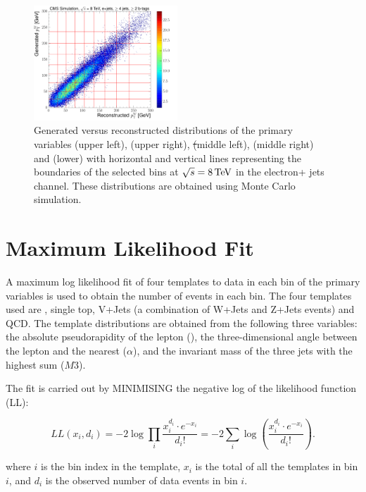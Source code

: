\begin{figure}[hbtp]
	 \includegraphics[width=0.48\textwidth]{Chapters/04_Analysis/04b_XSections/images/binning/electron_WPT_8TeV.pdf}\hfill
	 \caption{Generated versus reconstructed distributions of the primary variables \met (upper left), \HT (upper
	 right), \st (middle left), \mt (middle right) and \wpt (lower) with horizontal and vertical lines
	 representing the boundaries of the selected bins at $\sqrt{s}=8\,\text{Te\hspace{-.08em}V}$ in the electron+ jets channel. These
	 distributions are obtained using \ttbar Monte Carlo simulation.}
     \label{fig:binning_8TeV_electron}
 \end{figure}
\FloatBarrier

\section{Maximum Likelihood Fit}
\label{maximum_likelihood_fit}
A maximum log likelihood fit of four templates to data in each bin of the primary variables is used to obtain
the number of events in each bin. The four templates used are \ttbar, single top, V+Jets (a combination of
W+Jets and Z+Jets events) and QCD. The template distributions are obtained from the following three
variables: the absolute pseudorapidity of the lepton (\abseta), the three-dimensional angle between the lepton
and the nearest \bjet ($\alpha$), and the invariant mass of the three jets with the highest \pt sum ($M3$).

The fit is carried out by MINIMISING the negative log of the likelihood function (LL):

\begin{equation}
\label{log_likelihood}
LL\left(x_i, d_i\right) = -2 \log{\prod\limits_{i}\frac{x_i^{d_i}\cdot
e^{-x_i}}{d_i!}}=-2\sum\limits_{i}\log{\left(\frac{x_i^{d_i}\cdot e^{-x_i}}{d_i!}\right)}.
\end{equation}

where $i$ is the bin index in the template, $x_i$ is the total of all the templates in bin $i$, and $d_i$ is
the observed number of data events in  bin $i$.

